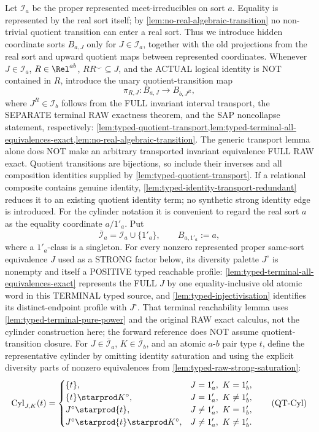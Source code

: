 Let \(\mathcal I_a\) be the proper represented meet-irreducibles on sort
\(a\).  Equality is represented by the real sort itself; by
\cref{lem:no-real-algebraic-transition} no non-trivial quotient transition
can enter a real sort.  Thus we introduce hidden coordinate sorts
\(B_{a,J}\) only for \(J\in\mathcal I_a\), together with the old projections
from the real sort and upward quotient maps between represented coordinates.
Whenever \(J\in\mathcal I_a\), \(R\in\Rel^{ab}\),
\(RR^{\smile}\subseteq J\), and the ACTUAL logical
identity is NOT contained in \(R\), introduce
the unary quotient-transition map
\[
 \pi_{R,J}:B_{a,J}\longrightarrow B_{b,J^R},
\tag{QT3}\label{eq:typed-transition-function}
\]
where \(J^R\in\mathcal I_b\) follows from the FULL invariant
interval transport, the SEPARATE terminal RAW exactness theorem,
and the SAP noncollapse statement, respectively:
\cref{lem:typed-quotient-transport,lem:typed-terminal-all-equivalences-exact,lem:no-real-algebraic-transition}.
The generic transport lemma alone does NOT make an arbitrary
transported invariant equivalence FULL RAW exact.
Quotient transitions are bijections, so include their inverses and all
composition identities supplied by \cref{lem:typed-quotient-transport}.
If a relational composite contains genuine identity,
\cref{lem:typed-identity-transport-redundant}
reduces it to an existing quotient identity term;
no synthetic strong identity edge is introduced.
For
the cylinder notation it is convenient to regard the real sort \(a\) as the
equality coordinate \(a/1'_a\).  Put
\[
 \overline{\mathcal I}_a=\mathcal I_a\cup\{1'_a\},
 \qquad B_{a,1'_a}:=a,
\]
where a \(1'_a\)-class is a singleton.
For every nonzero represented proper
same-sort equivalence \(J\)
used as a STRONG factor below,
its diversity palette \(J^\circ\)
is nonempty and itself a
POSITIVE typed reachable profile:
\cref{lem:typed-terminal-all-equivalences-exact}
represents the FULL \(J\)
by one equality-inclusive
old atomic word in this
TERMINAL typed source, and
\cref{lem:typed-injectivisation}
identifies its distinct-endpoint
profile with \(J^\circ\).
That terminal reachability
lemma uses
\cref{lem:typed-terminal-pure-power}
and the original RAW exact
calculus, not the cylinder
construction here; the forward
reference does NOT assume
quotient-transition closure.
For
\(J\in\overline{\mathcal I}_a\),
\(K\in\overline{\mathcal I}_b\), and an atomic \(a\)-\(b\) pair type \(t\),
define the representative cylinder by omitting identity
saturation and using the explicit diversity
parts of nonzero equivalences from
\cref{lem:typed-raw-strong-saturation}:
\[
 \operatorname{Cyl}_{J,K}(t)=
 \begin{cases}
 \{t\},&J=1'_a,\ K=1'_b,\\
 \{t\}\starprod K^\circ,&J=1'_a,\ K\neq1'_b,\\
 J^\circ\starprod\{t\},&J\neq1'_a,\ K=1'_b,\\
 J^\circ\starprod\{t\}\starprod K^\circ,&J\neq1'_a,\ K\neq1'_b.
 \end{cases}
\tag{QT-Cyl}\label{eq:typed-cylinder}
\]

